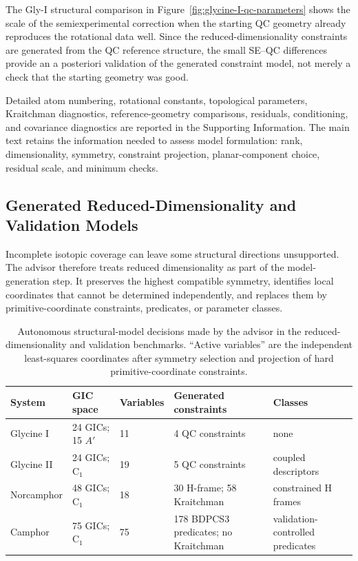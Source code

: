 \documentclass[aip,jcp,reprint,longbibliography,floatfix]{revtex4-2}
\begin{document}
The Gly-I structural comparison in
Figure~\ref{fig:glycine-I-qc-parameters} shows the scale of the
semiexperimental correction when the starting QC geometry already reproduces
the rotational data well. Since the reduced-dimensionality constraints are
generated from the QC reference structure, the small SE--QC differences
provide an a posteriori validation of the generated constraint
model, not merely a check that the starting geometry was good.

Detailed atom numbering, rotational constants, topological parameters,
Kraitchman diagnostics, reference-geometry comparisons, residuals, conditioning, and
covariance diagnostics are reported in the Supporting Information. The main text
retains the information needed to
assess model formulation: rank, dimensionality, symmetry, constraint
projection, planar-component choice, residual scale, and minimum checks.

\subsection{Generated Reduced-Dimensionality and Validation Models}

Incomplete isotopic coverage can leave some structural directions unsupported.
The advisor therefore treats reduced dimensionality as part of the
model-generation step. It preserves the highest compatible symmetry, identifies
local coordinates that cannot be determined independently, and replaces them
by primitive-coordinate constraints, predicates, or parameter classes.

\begin{table}
\caption{Autonomous structural-model decisions made by the advisor in the
reduced-dimensionality and validation benchmarks. ``Active variables'' are the
independent least-squares coordinates after symmetry selection and projection
of hard primitive-coordinate constraints.}
\label{tab:advisor-decisions}
\small
\setlength{\tabcolsep}{3.5pt}
\begin{tabular}{@{}lllll@{}}
\toprule
System & GIC space & Variables & Generated constraints & Classes \\
\midrule
Glycine I & 24 GICs; 15 $A'$ & 11 & 4 QC constraints & none \\
Glycine II & 24 GICs; C$_1$ & 19 & 5 QC constraints & coupled descriptors \\
Norcamphor & 48 GICs; C$_1$ & 18 & 30 H-frame; 58 Kraitchman & constrained H frames \\
Camphor & 75 GICs; C$_1$ & 75 & 178 BDPCS3 predicates; no Kraitchman & validation-controlled predicates \\
\bottomrule
\end{tabular}
\end{table}
\end{document}
